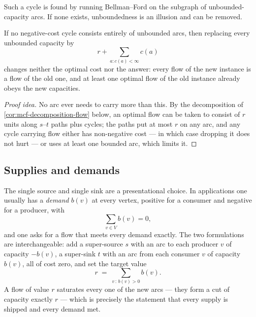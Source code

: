 Such a cycle is found by running Bellman--Ford on the subgraph of
unbounded-capacity arcs. If none exists, unboundedness is an illusion and can be
removed.

\begin{lemma}\label{lem:mcf-bound-capacities}
If no negative-cost cycle consists entirely of unbounded arcs, then replacing
every unbounded capacity by
\[ r + \sum_{a : c(a) < \infty} c(a) \]
changes neither the optimal cost nor the answer: every flow of the new
instance is a flow of the old one, and at least one optimal flow of the old
instance already obeys the new capacities.
\end{lemma}

\begin{proof}[Proof idea]
No arc ever needs to carry more than this. By the decomposition of
\cref{cor:mcf-decomposition-flow} below, an optimal flow can be taken to
consist of
$r$ units along $s$--$t$ paths plus cycles; the paths put at most $r$ on any
arc, and any cycle carrying flow either has non-negative cost --- in which case
dropping it does not hurt --- or uses at least one bounded arc, which limits it.
\end{proof}

\subsection{Supplies and demands}
\label{sec:mcf-demands}

The single source and single sink are a presentational choice. In applications
one usually has a \emph{demand} $b(v)$ at every vertex, positive for a consumer
and negative for a producer, with
\[ \sum_{v \in V} b(v) = 0, \]
and one asks for a flow that meets every demand exactly. The two formulations
are interchangeable: add a super-source $s$ with an arc to each producer $v$ of
capacity $-b(v)$, a super-sink $t$ with an arc from each consumer $v$ of
capacity $b(v)$, all of cost zero, and set the target value
\[ r \;=\; \sum_{v \,:\, b(v) > 0} b(v). \]
A flow of value $r$ saturates every one of the new arcs --- they form a cut of
capacity exactly $r$ --- which is precisely the statement that every supply is
shipped and every demand met.

